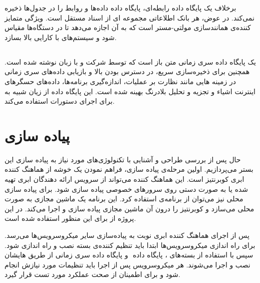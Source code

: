برخلاف یک پایگاه داده رابطه‌ای، پایگاه داده  داده‌ها و روابط را در جدول‌ها ذخیره نمی‌کند. در عوض، هر بانک اطلاعاتی مجموعه ای از اسناد مستقل است. ویژگی متمایز کننده‌ی  همانند‌سازی ‌مولتی-مستر است که به آن اجازه می‌دهد تا در دستگاه‌ها مقیاس شود و سیستم‌های با کارایی بالا بسازد.
\cite{couchdb}

\subsection{}

 یک پایگاه داده سری زمانی متن باز است که توسط شرکت  و با زبان  نوشته شده است. همچنین برای ذخیره‌سازی سریع، در دسترس بودن بالا و بازیابی داده‌های سری زمانی در زمینه هایی مانند نظارت بر عملیات، اندازه‌گیری برنامه‌ها، داده‌های حسگرهای اینترنت اشیاء و تجزیه و تحلیل بلادرنگ بهینه شده است. این پایگاه داده از زیان شبیه به  برای اجرای دستورات استفاده می‌کند.
\cite{influxdb}

\newpage

\section{پیاده سازی}

حال پس از بررسی طراحی و آشنایی با تکنولوژی‌های مورد نیاز به پیاده سازی این بستر می‌پردازیم. اولین مرحله‌ی پیاده سازی، فراهم نمودن یک خوشه از هماهنگ کننده ابری کوبرنتیز است. این هماهنگ کننده می‌تواند از سرویس‌ ارائه دهندگان ابری تهیه شده یا به صورت دستی روی سرور‌های خصوصی ‌پیاده سازی شود. برای پیاده سازی محلی نیز می‌توان از برنامه‌ی  استفاده کرد. این برنامه یک ماشین مجازی به صورت محلی می‌سازد و کوبرنتیز را درون آن ماشین مجازی پیاده سازی و اجرا می‌کند. در این پروژه از  برای این منظور استفاده شده است.

پس از اجرای هماهنگ کننده ابری نوبت به پیاده‌سازی سایر میکروسرویس‌ها می‌رسد. برای راه اندازی میکروسرویس‌ها ابتدا باید تنظیم کننده‌ی بسته  نصب و راه اندازی شود. سپس با استفاده از  بسته‌های ، پایگاه داده ‌ و پایگاه داده سری زمانی  از طریق  هایشان نصب و اجرا می‌شوند. هر میکروسرویس پس از اجرا باید تنظیمات مورد نیازش انجام شود و برای اطمینان از صحت عملکرد مورد تست قرار گیرد.

\subsection{}


